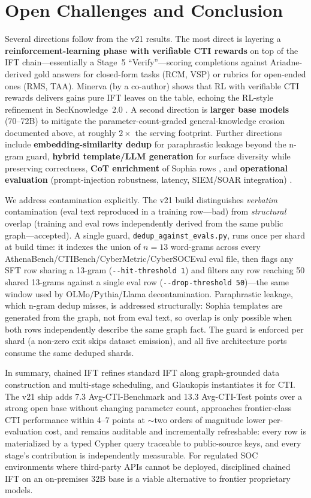 \documentclass[conference]{IEEEtran}
\providecommand{\hfid}[1]{{\small\nolinkurl{#1}}}
\begin{document}
\section{Open Challenges and Conclusion}
\label{sec:open-challenges}

Several directions follow from the v21 results. The most direct is layering a \textbf{reinforcement-learning phase with verifiable CTI rewards} on top of the IFT chain---essentially a Stage~5 ``Verify''---scoring completions against Ariadne-derived gold answers for closed-form tasks (RCM, VSP) or rubrics for open-ended ones (RMS, TAA). Minerva \cite{alam2026minerva} (by a co-author) shows that RL with verifiable CTI rewards delivers gains pure IFT leaves on the table, echoing the RL-style refinement in SecKnowledge~2.0 \cite{levi2025toward}. A second direction is \textbf{larger base models} (70--72B) to mitigate the parameter-count-graded general-knowledge erosion documented above, at roughly $2\times$ the serving footprint. Further directions include \textbf{embedding-similarity dedup} for paraphrastic leakage beyond the n-gram guard, \textbf{hybrid template/LLM generation} for surface diversity while preserving correctness, \textbf{CoT enrichment} of Sophia rows \cite{levi2025toward}, and \textbf{operational evaluation} (prompt-injection robustness, latency, SIEM/SOAR integration) \cite{hu2024seceval,liu2024cyberbench,alam2025athenabench}.

We address contamination explicitly. The v21 build distinguishes \emph{verbatim} contamination (eval text reproduced in a training row---bad) from \emph{structural} overlap (training and eval rows independently derived from the same public graph---accepted). A single guard, \hfid{dedup_against_evals.py}, runs once per shard at build time: it indexes the union of $n{=}13$ word-grams across every AthenaBench/CTIBench/CyberMetric/CyberSOCEval eval file, then flags any SFT row sharing a 13-gram (\hfid{--hit-threshold 1}) and filters any row reaching 50 shared 13-grams against a single eval row (\hfid{--drop-threshold 50})---the same window used by OLMo/Pythia/Llama decontamination. Paraphrastic leakage, which n-gram dedup misses, is addressed structurally: Sophia templates are generated from the graph, not from eval text, so overlap is only possible when both rows independently describe the same graph fact. The guard is enforced per shard (a non-zero exit skips dataset emission), and all five architecture ports consume the same deduped shards.

In summary, chained IFT refines standard IFT along graph-grounded data construction and multi-stage scheduling, and Glaukopis instantiates it for CTI. The v21 ship adds 7.3 Avg-CTI-Benchmark and 13.3 Avg-CTI-Test points over a strong open base without changing parameter count, approaches frontier-class CTI performance within 4--7 points at ${\sim}$two orders of magnitude lower per-evaluation cost, and remains auditable and incrementally refreshable: every row is materialized by a typed Cypher query traceable to public-source keys, and every stage's contribution is independently measurable. For regulated SOC environments where third-party APIs cannot be deployed, disciplined chained IFT on an on-premises 32B base is a viable alternative to frontier proprietary models.
\end{document}
